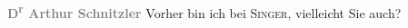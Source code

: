 \begin{ledgroupsized}[t]{13cm}
           \pstart
           \centering{}\textcolor{gray}{\textbf{D\textsuperscript{r} Arthur Schnitzler}}\pend
           \pstart
           \noindent{}Vorher bin ich bei \textsc{Singer}, vielleicht Sie auch?\pend
                     \endnumbering{}\end{ledgroupsized}  \newcommand{\dateiname}{L00189}\newcommand{\titel}{Arthur Schnitzler an Richard Beer-Hofmann, [14. 3. 1893?]}\newcommand{\editorInnen}{Martin Anton Müller und Gerd-Hermann Susen}
            \footnotesize
\begin{ledgroupsized}[t]{11.5cm}
\end{ledgroupsized}
         
      